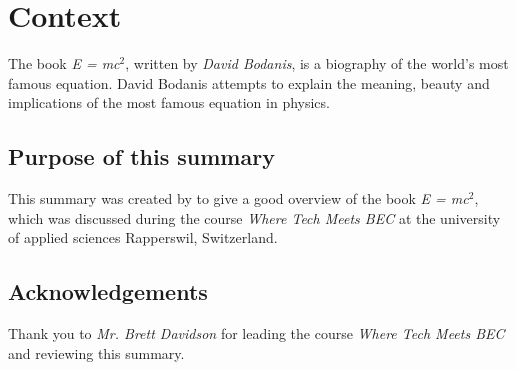 %

\chapter{Context}
The book \emph{E = mc$^2$}, written by \emph{David Bodanis}, is a biography of the world's most famous equation.
David Bodanis attempts to explain the meaning, beauty and implications of the most famous equation in physics.

\section*{Purpose of this summary}

This summary was created by \emph{\documentauthors} to give a good overview of the book \emph{E = mc$^2$}, which was discussed during the course \emph{Where Tech Meets BEC} at the university of applied sciences Rapperswil, Switzerland.

\section*{Acknowledgements}

Thank you to \emph{Mr. Brett Davidson} for leading the course \emph{Where Tech Meets BEC} and reviewing this summary.